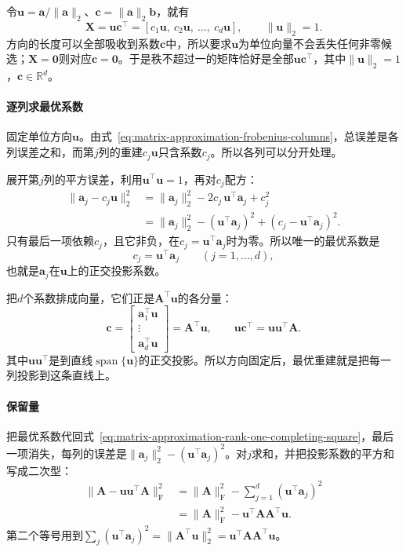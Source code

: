 令$\bm u=\bm a/\lVert\bm a\rVert_2$、$\bm c=\lVert\bm a\rVert_2\bm b$，就有
\[
 \bm X=\bm u\bm c^\top=[c_1\bm u,\ c_2\bm u,\ \ldots,\ c_d\bm u],\qquad\lVert\bm u\rVert_2=1 .
\]
方向的长度可以全部吸收到系数$\bm c$中，所以要求$\bm u$为单位向量不会丢失任何非零候选；$\bm X=\bm0$则对应$\bm c=\bm0$。于是秩不超过一的矩阵恰好是全部$\bm u\bm c^\top$，其中$\lVert\bm u\rVert_2=1$，$\bm c\in\mathbb R^d$。

\paragraph{逐列求最优系数}
固定单位方向$\bm u$。由式~\eqref{eq:matrix-approximation-frobenius-columns}，总误差是各列误差之和，而第$j$列的重建$c_j\bm u$只含系数$c_j$。所以各列可以分开处理。

展开第$j$列的平方误差，利用$\bm u^\top\bm u=1$，再对$c_j$配方：
\begin{equation}
 \begin{aligned}
 \lVert\bm a_j-c_j\bm u\rVert_2^2
 &=\lVert\bm a_j\rVert_2^2-2c_j\,\bm u^\top\bm a_j+c_j^2\\
 &=\lVert\bm a_j\rVert_2^2-(\bm u^\top\bm a_j)^2+(c_j-\bm u^\top\bm a_j)^2 .
 \end{aligned}
 \label{eq:matrix-approximation-rank-one-completing-square}
\end{equation}
只有最后一项依赖$c_j$，且它非负，在$c_j=\bm u^\top\bm a_j$时为零。所以唯一的最优系数是
\[
 c_j=\bm u^\top\bm a_j\qquad(j=1,\ldots,d),
\]
也就是$\bm a_j$在$\bm u$上的正交投影系数。

把$d$个系数排成向量，它们正是$\bm A^\top\bm u$的各分量：
\begin{equation}
 \bm c=\begin{bmatrix}\bm a_1^\top\bm u\\\vdots\\\bm a_d^\top\bm u\end{bmatrix}=\bm A^\top\bm u,\qquad
 \bm u\bm c^\top=\bm u\bm u^\top\bm A .
 \label{eq:matrix-approximation-rank-one-coefficients}
\end{equation}
其中$\bm u\bm u^\top$是到直线$\operatorname{span}\{\bm u\}$的正交投影。所以方向固定后，最优重建就是把每一列投影到这条直线上。

\paragraph{保留量}
把最优系数代回式~\eqref{eq:matrix-approximation-rank-one-completing-square}，最后一项消失，每列的误差是$\lVert\bm a_j\rVert_2^2-(\bm u^\top\bm a_j)^2$。对$j$求和，并把投影系数的平方和写成二次型：
\begin{equation}
 \begin{aligned}
 \lVert\bm A-\bm u\bm u^\top\bm A\rVert_{\mathrm F}^2
 &=\lVert\bm A\rVert_{\mathrm F}^2-\sum_{j=1}^d(\bm u^\top\bm a_j)^2\\
 &=\lVert\bm A\rVert_{\mathrm F}^2-\bm u^\top\bm A\bm A^\top\bm u .
 \end{aligned}
 \label{eq:matrix-approximation-rank-one-error}
\end{equation}
第二个等号用到$\sum_j(\bm u^\top\bm a_j)^2=\lVert\bm A^\top\bm u\rVert_2^2=\bm u^\top\bm A\bm A^\top\bm u$。

